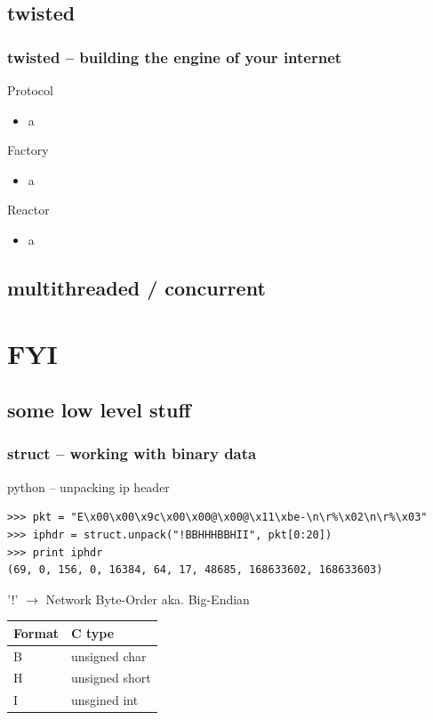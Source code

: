 \documentclass{beamer}
\begin{document}
\subsection*{twisted}	%
\begin{frame}[fragile]
	\frametitle{twisted -- building the engine of your internet}
	\begin{block}{Protocol}
	\begin{itemize}
		\item a
	\end{itemize}
	\end{block}

	\begin{block}{Factory}
	\begin{itemize}
		\item a
	\end{itemize}
	\end{block}

	\begin{block}{Reactor}
	\begin{itemize}
		\item a
	\end{itemize}
	\end{block}
\end{frame}

\subsection*{multithreaded / concurrent}	%


\section{FYI}

\subsection*{some low level stuff}	%

\begin{frame}[fragile]
	\frametitle{struct -- working with binary data}
	\begin{exampleblock}{python -- unpacking ip header}
	\begin{lstlisting}
>>> pkt = "E\x00\x00\x9c\x00\x00@\x00@\x11\xbe-\n\r%\x02\n\r%\x03"
>>> iphdr = struct.unpack("!BBHHHBBHII", pkt[0:20])
>>> print iphdr
(69, 0, 156, 0, 16384, 64, 17, 48685, 168633602, 168633603)
	\end{lstlisting}
	\end{exampleblock}
	'!' $\rightarrow$ Network Byte-Order aka. Big-Endian\\[0.4cm]
	\begin{tabular}{|l|l|}	
	Format & C type\\
	\hline
	B & unsigned char\\
	H & unsigned short\\
	I & unsgined int\\	
	\end{tabular}
\end{frame}
\end{document}
